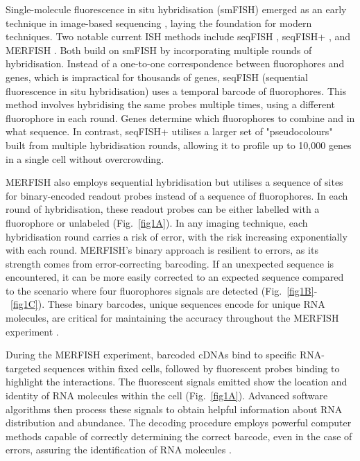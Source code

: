 \documentclass[10pt,letterpaper]{article}
\begin{document}
\noindent Single-molecule fluorescence in situ hybridisation (smFISH) emerged as an early technique in image-based sequencing \parencite{femino-1998}, laying the foundation for modern techniques. Two notable current ISH methods include seqFISH \parencite{lubeck-2014}, seqFISH+ \parencite{eng-2019}, and MERFISH \parencite{chen-2015}. Both build on smFISH by incorporating multiple rounds of hybridisation. Instead of a one-to-one correspondence between fluorophores and genes, which is impractical for thousands of genes, seqFISH (sequential fluorescence in situ hybridisation) uses a temporal barcode of fluorophores. This method involves hybridising the same probes multiple times, using a different fluorophore in each round. Genes determine which fluorophores to combine and in what sequence. In contrast, seqFISH+ utilises a larger set of "pseudocolours" built from multiple hybridisation rounds, allowing it to profile up to 10,000 genes in a single cell without overcrowding.

\noindent MERFISH also employs sequential hybridisation but utilises a sequence of sites for binary-encoded readout probes instead of a sequence of fluorophores. In each round of hybridisation, these readout probes can be either labelled with a fluorophore or unlabeled (Fig.~\ref{fig1A}). In any imaging technique, each hybridisation round carries a risk of error, with the risk increasing exponentially with each round. MERFISH's binary approach is resilient to errors, as its strength comes from error-correcting barcoding. If an unexpected sequence is encountered, it can be more easily corrected to an expected sequence compared to the scenario where four fluorophores signals are detected (Fig.~\ref{fig1B}-~\ref{fig1C}). These binary barcodes, unique sequences encode for unique RNA molecules, are critical for maintaining the accuracy throughout the MERFISH experiment \parencite{moffitt-2016}.  

\noindent During the MERFISH experiment, barcoded cDNAs bind to specific RNA-targeted sequences within fixed cells, followed by fluorescent probes binding to highlight the interactions. The fluorescent signals emitted show the location and identity of RNA molecules within the cell (Fig.~\ref{fig1A}). Advanced software algorithms then process these signals to obtain helpful information about RNA distribution and abundance. The decoding procedure employs powerful computer methods capable of correctly determining the correct barcode, even in the case of errors, assuring the identification of RNA molecules \parencite{moffitt-2016}. 
\end{document}
